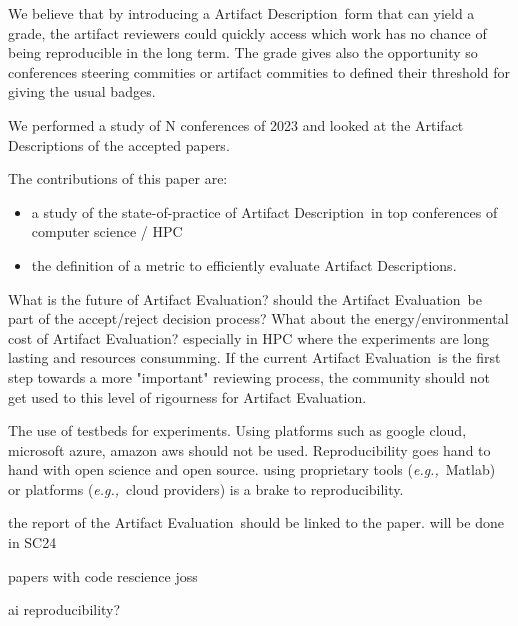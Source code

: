 \documentclass[sigconf]{acmart}
\newcommand{\eg}{\emph{e.g.,}}
\newcommand{\ad}{Artifact Description}
\newcommand{\aeval}{Artifact Evaluation}
\begin{document}
We believe that by introducing a \ad\ form that can yield a grade, the artifact reviewers could quickly access which work has no chance of being reproducible in the long term.
The grade gives also the opportunity so conferences steering commities or artifact commities to defined their threshold for giving the usual badges.


We performed a study of N conferences of 2023 and looked at the \ad s of the accepted papers.

The contributions of this paper are:
\begin{itemize}
  \item a study of the state-of-practice of \ad\ in top conferences of computer science / HPC
  \item the definition of a metric to efficiently evaluate \ad s.
\end{itemize}


What is the future of \aeval?
should the \aeval\ be part of the accept/reject decision process?
What about the energy/environmental cost of \aeval?
especially in HPC where the experiments are long lasting and resources consumming.
If the current \aeval\ is the first step towards a more "important" reviewing process, the community should not get used to this level of rigourness for \aeval.


The use of testbeds for experiments.
Using platforms such as google cloud, microsoft azure, amazon aws should not be used.
Reproducibility goes hand to hand with open science and open source.
using proprietary tools (\eg\ Matlab) or platforms (\eg\ cloud providers) is a brake to reproducibility.


the report of the \aeval\ should be linked to the paper.
will be done in SC24

papers with code
rescience
joss

ai reproducibility?






\end{document}
